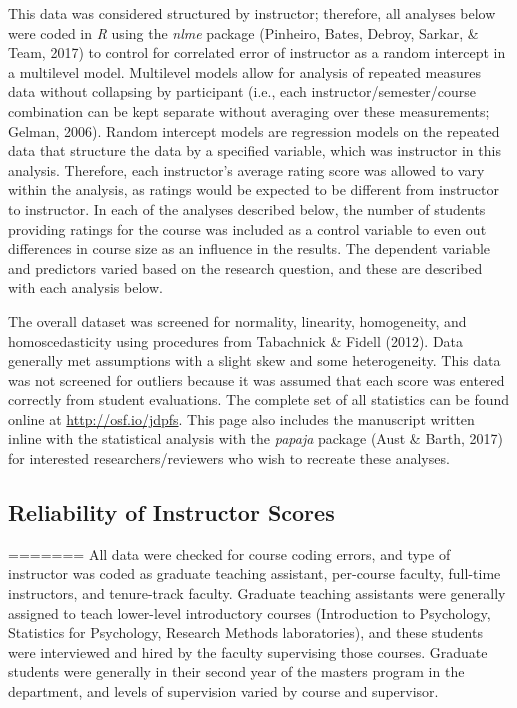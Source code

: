 \documentclass[man]{apa6}
\theoremstyle{definition}
\theoremstyle{definition}
\theoremstyle{definition}
\theoremstyle{remark}
\begin{document}
This data was considered structured by instructor; therefore, all
analyses below were coded in \emph{R} using the \emph{nlme} package
(Pinheiro, Bates, Debroy, Sarkar, \& Team, 2017) to control for
correlated error of instructor as a random intercept in a multilevel
model. Multilevel models allow for analysis of repeated measures data
without collapsing by participant (i.e., each instructor/semester/course
combination can be kept separate without averaging over these
measurements; Gelman, 2006). Random intercept models are regression
models on the repeated data that structure the data by a specified
variable, which was instructor in this analysis. Therefore, each
instructor's average rating score was allowed to vary within the
analysis, as ratings would be expected to be different from instructor
to instructor. In each of the analyses described below, the number of
students providing ratings for the course was included as a control
variable to even out differences in course size as an influence in the
results. The dependent variable and predictors varied based on the
research question, and these are described with each analysis below.

The overall dataset was screened for normality, linearity, homogeneity,
and homoscedasticity using procedures from Tabachnick \& Fidell (2012).
Data generally met assumptions with a slight skew and some
heterogeneity. This data was not screened for outliers because it was
assumed that each score was entered correctly from student evaluations.
The complete set of all statistics can be found online at
\url{http://osf.io/jdpfs}. This page also includes the manuscript
written inline with the statistical analysis with the \emph{papaja}
package (Aust \& Barth, 2017) for interested researchers/reviewers who
wish to recreate these analyses.

\subsection{Reliability of Instructor
Scores}\label{reliability-of-instructor-scores}
=======
All data were checked for course coding errors, and type of instructor was coded as graduate teaching assistant, per-course faculty, full-time instructors, and tenure-track faculty. Graduate teaching assistants were generally assigned to teach lower-level introductory courses (Introduction to Psychology, Statistics for Psychology, Research Methods laboratories), and these students were interviewed and hired by the faculty supervising those courses. Graduate students were generally in their second year of the masters program in the department, and levels of supervision varied by course and supervisor.
\end{document}
